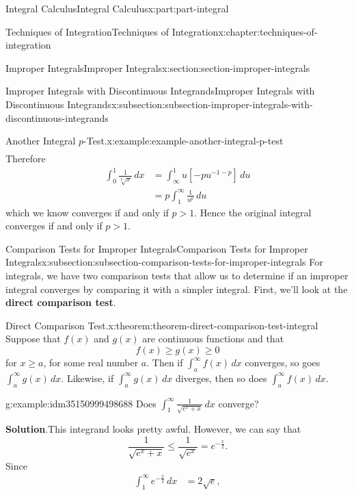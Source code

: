 \documentclass[twoside,10pt,]{book}
\newcommand{\blocktitlefont}{\relax}
\newcommand{\terminology}[1]{\textbf{#1}}
\numberwithin{equation}{part}
\newcommand{\gt}{>}
\begin{document}
\begin{partptx}{Integral Calculus}{}{Integral Calculus}{}{}{x:part:part-integral}
\begin{chapterptx}{Techniques of Integration}{}{Techniques of Integration}{}{}{x:chapter:techniques-of-integration}
\begin{sectionptx}{Improper Integrals}{}{Improper Integrals}{}{}{x:section:section-improper-integrals}
\begin{subsectionptx}{Improper Integrals with Discontinuous Integrands}{}{Improper Integrals with Discontinuous Integrands}{}{}{x:subsection:subsection-improper-integrals-with-discontinuous-integrands}
\begin{example}{Another Integral \(p\)-Test.}{x:example:example-another-integral-p-test}
\begin{align*}
\end{align*}
Therefore%
\begin{align*}
\int_{0}^{1}\frac{1}{\sqrt[p]{x}}\,dx &= \int_{\infty}^{1}u\left[-pu^{-1 - p}\right]\,du\\
& = p\int_{1}^{\infty}\frac{1}{u^{p}}\,du
\end{align*}
which we know converges if and only if \(p \gt 1\). Hence the original integral converges if and only if \(p\gt1\).%
\end{example}
\end{subsectionptx}
%
%
\typeout{************************************************}
\typeout{************************************************}
%
\begin{subsectionptx}{Comparison Tests for Improper Integrals}{}{Comparison Tests for Improper Integrals}{}{}{x:subsection:subsection-comparison-tests-for-improper-integrals}
For integrals, we have two comparison tests that allow us to determine if an improper integral converges by comparing it with a simpler integral. First, we'll look at the \terminology{direct comparison test}.%
\begin{theorem}{Direct Comparison Test.}{}{x:theorem:theorem-direct-comparison-test-integral}%
%
Suppose that \(f(x)\) and \(g(x)\) are continuous functions and that%
\begin{equation*}
f(x) \geq g(x) \geq 0
\end{equation*}
for \(x\geq a\), for some real number \(a\). Then if \(\int_{a}^{\infty}f(x)\,dx\) converges, so goes \(\int_{a}^{\infty}g(x)\,dx\). Likewise, if \(\int_{a}^{\infty}g(x)\,dx\) diverges, then so does \(\int_{a}^{\infty}f(x)\,dx\).%
\end{theorem}
\begin{example}{}{g:example:idm35150999498688}%
Does \(\int_{1}^{\infty}\frac{1}{\sqrt{e^{x} + x}}\,dx\) converge?%
\par\smallskip%
\noindent\textbf{\blocktitlefont Solution}.\hypertarget{g:solution:idm35150999497792}{}\quad{}This integrand looks pretty awful. However, we can say that%
\begin{equation*}
\frac{1}{\sqrt{e^{x} + x}} \leq \frac{1}{\sqrt{e^{x}}} = e^{-\frac{x}{2}}.
\end{equation*}
Since%
\begin{align*}
\int_{1}^{\infty}e^{-\frac{x}{2}}\,dx & = 2\sqrt{e}, 
\end{align*}

\end{example}
\end{subsectionptx}
\end{sectionptx}
\end{chapterptx}
\end{partptx}
\end{document}
